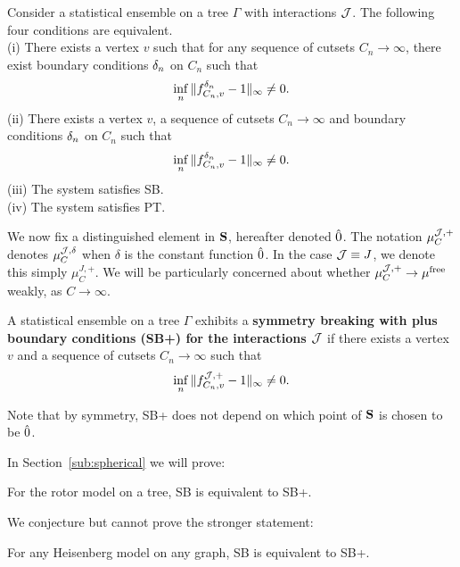 \begin{prop} \label{prop:SB=}
Consider a statistical ensemble on a tree $\Gamma$ with interactions $\J$. 
The following four conditions are equivalent. \\
(i) There exists a vertex $v$ such that for 
any sequence of cutsets $C_n\to\infty$, there exist boundary 
conditions $\p_n$ on $C_n$ such that
$$
\inf_n \|f_{C_n,v}^{\p_n}-1\|_\infty \neq 0.
$$
(ii)  There exists a vertex $v$, a
sequence of cutsets $C_n\to\infty$ and boundary 
conditions $\p_n$ on $C_n$ such that
$$
\inf_n \|f_{C_n,v}^{\p_n}-1\|_\infty \neq 0.
$$
(iii) The system satisfies SB. \\
(iv) The system satisfies PT.
\end{prop}

We now fix a distinguished element in $\S$, hereafter denoted $\zero$.  
The notation $\mu^{\J , +}_C$ denotes $\mu^{\J , \delta}_C$ when 
$\delta$ is the constant function $\zero$.  In the case $\J \equiv J$, we
denote this simply $\mu^{J,+}_C$.  We will be particularly concerned
about whether $\mu^{\J , +}_C \rightarrow \mufree$ weakly, as 
$C \rightarrow \infty$.    

\begin{defn} \label{defn:SB+}
A statistical ensemble on a tree $\Gamma$ exhibits a 
{\bf symmetry breaking with plus boundary conditions (SB+) for the 
interactions $\J$} if there exists a vertex $v$ and a sequence of 
cutsets $C_n\to\infty$ such that
$$
\inf_n \|f_{C_n,v}^{\J,+}-1\|_\infty \neq 0.
$$
\end{defn}

Note that by symmetry, SB+ does not depend on which point of $\S$
is chosen to be $\zero$.

In Section~\ref{sub:spherical} we will prove:
%
\begin{pr} \label{pr:rotor equiv}
For the rotor model on a tree, SB is equivalent to SB+.  
\end{pr}

We conjecture but cannot prove the stronger statement:
\begin{conj} \label{conj:SB}
For any Heisenberg model on any graph, SB is equivalent to SB+.
\end{conj}

